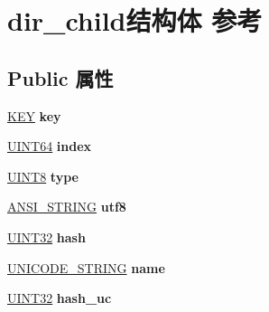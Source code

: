 \hypertarget{structdir__child}{}\section{dir\+\_\+child结构体 参考}
\label{structdir__child}
\subsection*{Public 属性}
\begin{DoxyCompactItemize}
\item 
\mbox{\label{structdir__child_af6dac542766595511a0a37691df5ce3d}} 
\hyperlink{struct_k_e_y}{K\+EY} {\bfseries key}
\item 
\mbox{\label{structdir__child_a336e44ae3764a0d10d210e204058a0e3}} 
\hyperlink{_processor_bind_8h_a57be03562867144161c1bfee95ca8f7c}{U\+I\+N\+T64} {\bfseries index}
\item 
\mbox{\label{structdir__child_ae4ae89bb05d82011ed10e65851c6cc6a}} 
\hyperlink{_processor_bind_8h_ab27e9918b538ce9d8ca692479b375b6a}{U\+I\+N\+T8} {\bfseries type}
\item 
\mbox{\label{structdir__child_a7bdfb9e97d45a6fe369325377e6defa4}} 
\hyperlink{struct___a_n_s_i___s_t_r_i_n_g}{A\+N\+S\+I\+\_\+\+S\+T\+R\+I\+NG} {\bfseries utf8}
\item 
\mbox{\label{structdir__child_ac2ba28ffee1286211df4150fcb4e050a}} 
\hyperlink{_processor_bind_8h_ae1e6edbbc26d6fbc71a90190d0266018}{U\+I\+N\+T32} {\bfseries hash}
\item 
\mbox{\label{structdir__child_a31569f52c097bcf8e0cc910bd2a7780b}} 
\hyperlink{struct___u_n_i_c_o_d_e___s_t_r_i_n_g}{U\+N\+I\+C\+O\+D\+E\+\_\+\+S\+T\+R\+I\+NG} {\bfseries name}
\item 
\mbox{\label{structdir__child_a01a41fd853c1eb7b6a73819cdf3c25a9}} 
\hyperlink{_processor_bind_8h_ae1e6edbbc26d6fbc71a90190d0266018}{U\+I\+N\+T32} {\bfseries hash\+\_\+uc}
\item 
\mbox{\label{structdir__child_a5afde65462f1c340d947cbf6e07723d9}} 

\end{DoxyCompactItemize}
